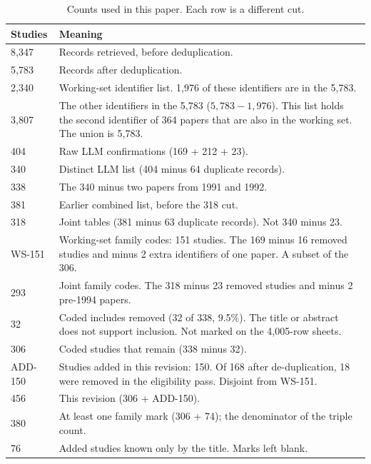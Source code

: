 \begin{table}[htbp]
\centering
\caption{Counts used in this paper. Each row is a different cut.}
\label{tab:ledger}
\small
\begin{tabular}{lp{8.1cm}}
\toprule
\textbf{Studies} & \textbf{Meaning} \\
\midrule
8{,}347 & Records retrieved, before deduplication. \\
5{,}783 & Records after deduplication. \\
2{,}340 & Working-set identifier list. 1{,}976 of these identifiers are in the 5{,}783. \\
3{,}807 & The other identifiers in the 5{,}783 ($5{,}783-1{,}976$). This list holds the second identifier of 364 papers that are also in the working set. The union is 5{,}783. \\
404 & Raw LLM confirmations (169 + 212 + 23). \\
340 & Distinct LLM list (404 minus 64 duplicate records). \\
338 & The 340 minus two papers from 1991 and 1992. \\
381 & Earlier combined list, before the 318 cut. \\
318 & Joint tables (381 minus 63 duplicate records). Not 340 minus 23. \\
WS-151 & Working-set family codes: 151 studies. The 169 minus 16 removed studies and minus 2 extra identifiers of one paper. A subset of the 306. \\
293 & Joint family codes. The 318 minus 23 removed studies and minus 2 pre-1994 papers. \\
32 & Coded includes removed (32 of 338, 9.5\%). The title or abstract does not support inclusion. Not marked on the 4{,}005-row sheets. \\
306 & Coded studies that remain (338 minus 32). \\
ADD-150 & Studies added in this revision: 150. Of 168 after de-duplication, 18 were removed in the eligibility pass. Disjoint from WS-151. \\
456 & This revision (306 + ADD-150). \\
380 & At least one family mark (306 + 74); the denominator of the triple count. \\
76 & Added studies known only by the title. Marks left blank. \\
\bottomrule
\end{tabular}
\end{table}

